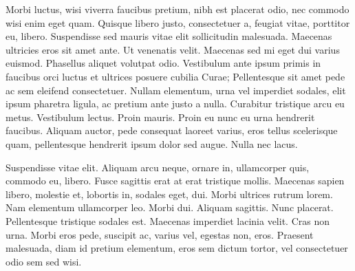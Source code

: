 %
{%
Morbi luctus, wisi viverra faucibus pretium, nibh est placerat odio,
nec commodo wisi enim eget quam. Quisque libero justo, consectetuer
a, feugiat vitae, porttitor eu, libero.  Suspendisse sed mauris
vitae elit sollicitudin malesuada. Maecenas ultricies eros sit amet
ante. Ut venenatis velit. Maecenas sed mi eget dui varius euismod.
Phasellus aliquet volutpat odio.  Vestibulum ante ipsum primis in
faucibus orci luctus et ultrices posuere cubilia Curae; Pellentesque
sit amet pede ac sem eleifend consectetuer. Nullam elementum, urna
vel imperdiet sodales, elit ipsum pharetra ligula, ac pretium ante
justo a nulla. Curabitur tristique arcu eu metus. Vestibulum lectus.
Proin mauris. Proin eu nunc eu urna hendrerit faucibus. Aliquam
auctor, pede consequat laoreet varius, eros tellus scelerisque quam,
pellentesque hendrerit ipsum dolor sed augue. Nulla nec lacus.

Suspendisse vitae elit. Aliquam arcu neque, ornare in, ullamcorper
quis, commodo eu, libero. Fusce sagittis erat at erat tristique
mollis. Maecenas sapien libero, molestie et, lobortis in, sodales
eget, dui. Morbi ultrices rutrum lorem. Nam elementum ullamcorper
leo. Morbi dui. Aliquam sagittis. Nunc placerat.  Pellentesque
tristique sodales est. Maecenas imperdiet lacinia velit. Cras non
urna. Morbi eros pede, suscipit ac, varius vel, egestas non, eros.
Praesent malesuada, diam id pretium elementum, eros sem dictum
tortor, vel consectetuer odio sem sed wisi.%
}
